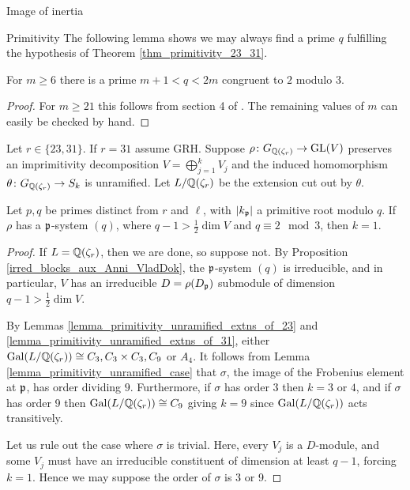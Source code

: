 \documentclass[11pt,a4paper]{article}
\newcommand{\Gcyclo}[1]{G_{\QQ(\zeta_{#1})}}
\begin{document}
\begin{section}{Image of inertia}
\begin{subsection}{Primitivity}
The following lemma shows we may always find a prime $q$ fulfilling the hypothesis of Theorem \ref{thm_primitivity_23_31}.
\begin{lemma}
\label{lemma_prim_bertrand_postulate}
For $m \geq 6$ there is a prime $m+1< q < 2m$ congruent to $2$ modulo $3$.
\end{lemma}

\begin{proof}
For $m \geq 21$ this follows from section 4 of \cite{Moree_Bertrands_postulate_primes_in_Arithmetic_progressions}.
The remaining values of $m$ can easily be checked by hand.
\end{proof}


\begin{theorem}
\label{thm_primitivity_23_31}
Let $ r\in \{23,31\}$. If $r=31$ assume GRH.
Suppose $\rho\colon \Gcyclo{r} \rightarrow \GL(V)$ preserves an imprimitivity decomposition $V=\bigoplus^{k}_{j=1}V_j$ and the induced homomorphism $\theta\colon \Gcyclo{r} \rightarrow S_k$ is unramified.
Let $L/\mathbb{Q}(\zeta_{r})$ be the extension cut out by $\theta$.

Let $p,q$ be primes distinct from $r$ and $\ell$, with $|k_{\mathfrak{p}}|$ a primitive root modulo $q$.
If $\rho$ has a  $\mathfrak{p}$-system $(q)$, where $q-1> \frac{1}{2}\dim V$ and $q \equiv 2 \mod{3}$, then $k=1$. 
\end{theorem}

\begin{proof}
If $L=\mathbb{Q}(\zeta_{r})$, then we are done, so suppose not.
By Proposition \ref{irred_blocks_aux_Anni_VladDok}, the $\mathfrak{p}$-system $(q)$ is irreducible, and in particular, $V$ has an irreducible $D=\rho(D_{\mathfrak{p}})$ submodule of dimension $q-1> \frac{1}{2} \dim V$.

By Lemmas \ref{lemma_primitivity_unramified_extns_of_23} and \ref{lemma_primitivity_unramified_extns_of_31}, either $\Gal(L/\QQ(\zeta_r)) \cong C_3, C_3 \times C_3, C_9$ or $A_4$.
It follows from Lemma \ref{lemma_primitivity_unramified_case} that $\sigma$, the image of the Frobenius element at $\mathfrak{p}$, has order dividing $9$. Furthermore, if $\sigma$ has order 3 then $k=3$ or $4$, and if $\sigma$ has order 9 then $\Gal(L/\QQ(\zeta_r)) \cong C_9$ giving $k=9$ since $\Gal(L/\QQ(\zeta_r))$ acts transitively.

Let us rule out the case where $\sigma$ is trivial. Here, every $V_j$ is a $D$-module, and some $V_j$ must have an irreducible constituent of dimension at least $q-1$, forcing $k=1$. Hence we may suppose the order of $\sigma$ is 3 or 9.



\end{proof}
\end{subsection}
\end{section}
\end{document}
